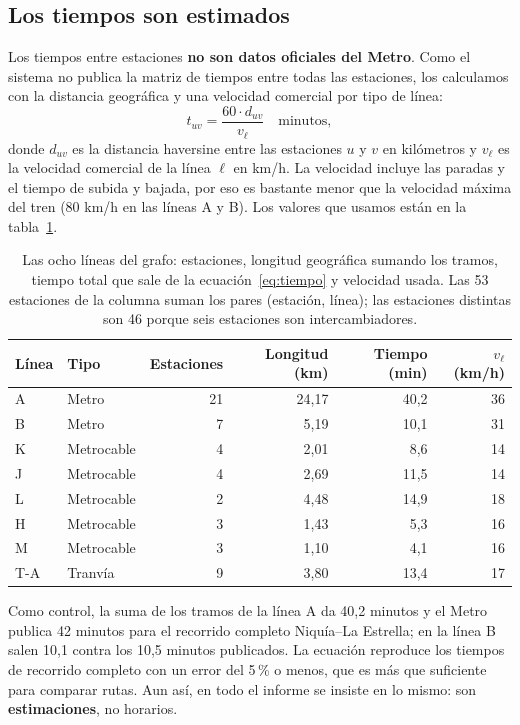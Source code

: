\documentclass[11pt,a4paper]{article}
\begin{document}
\subsection{Los tiempos son estimados}

Los tiempos entre estaciones \textbf{no son datos oficiales del Metro}. Como el
sistema no publica la matriz de tiempos entre todas las estaciones, los
calculamos con la distancia geográfica y una velocidad comercial por tipo de
línea:
\begin{equation}
  t_{uv} = \frac{60 \cdot d_{uv}}{v_{\ell}} \quad \text{minutos},
  \label{eq:tiempo}
\end{equation}
donde $d_{uv}$ es la distancia haversine entre las estaciones $u$ y $v$ en
kilómetros y $v_{\ell}$ es la velocidad comercial de la línea $\ell$ en km/h. La
velocidad incluye las paradas y el tiempo de subida y bajada, por eso es bastante
menor que la velocidad máxima del tren (80 km/h en las líneas A y B). Los valores
que usamos están en la tabla~\ref{tab:lineas}.

\begin{table}[htbp]
\centering
\small
\begin{tabular}{llrrrr}
\toprule
Línea & Tipo & Estaciones & Longitud (km) & Tiempo (min) & $v_\ell$ (km/h) \\
\midrule
A     & Metro      & 21 & 24,17 & 40,2 & 36 \\
B     & Metro      &  7 &  5,19 & 10,1 & 31 \\
K     & Metrocable &  4 &  2,01 &  8,6 & 14 \\
J     & Metrocable &  4 &  2,69 & 11,5 & 14 \\
L     & Metrocable &  2 &  4,48 & 14,9 & 18 \\
H     & Metrocable &  3 &  1,43 &  5,3 & 16 \\
M     & Metrocable &  3 &  1,10 &  4,1 & 16 \\
T-A   & Tranvía    &  9 &  3,80 & 13,4 & 17 \\
\bottomrule
\end{tabular}
\caption{Las ocho líneas del grafo: estaciones, longitud geográfica sumando los tramos, tiempo total que sale de la ecuación~\eqref{eq:tiempo} y velocidad usada. Las 53 estaciones de la columna suman los pares (estación, línea); las estaciones distintas son 46 porque seis estaciones son intercambiadores.}
\label{tab:lineas}
\end{table}

Como control, la suma de los tramos de la línea A da 40,2 minutos y el Metro
publica 42 minutos para el recorrido completo Niquía--La Estrella; en la línea B
salen 10,1 contra los 10,5 minutos publicados. La ecuación reproduce los tiempos
de recorrido completo con un error del 5\,\% o menos, que es más que suficiente
para comparar rutas. Aun así, en todo el informe se insiste en lo mismo: son
\textbf{estimaciones}, no horarios.
\end{document}
